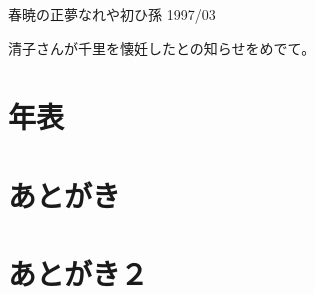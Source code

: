 \documentclass[b5paper]{tbook}
\begin{document}
\begin{shiika}春暁の正夢なれや初ひ孫 1997/03\end{shiika}

清子さんが千里を懐妊したとの知らせをめでて。

\chapter{年表}



\chapter*{あとがき}


\chapter*{あとがき２}


\end{document}
